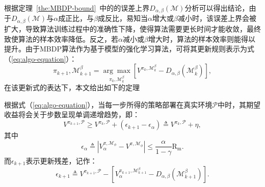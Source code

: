 根据定理~\ref{the:MBDP-bound}~中的的误差上界$D_{\alpha,\beta}(\mathcal{M})$分析可以得出结论，由于$D_{\alpha,\beta}(\mathcal{M})$与$\alpha$成正比，与$\beta$成反比，易知当$\alpha$增大或$\beta$减小时，该误差上界会被扩大，导致算法训练过程中的准确性下降，使得算法需要更长时间才能收敛，最终致使算法的样本效率降低。反之，若$\alpha$减小或$\beta$增大时，算法的样本效率则能得以提升。由于MBDP算法作为基于模型的强化学习算法，可将其更新规则表示为式（\ref{eq:algo-equation}）：
\begin{equation}
    \pi_{k+1}, \mathcal{M}^\beta_{k+1}=\underset{\pi_k, \mathcal{M}_k^\beta}{\arg\max}\left[{V}^{\pi_k, \mathcal{M}_k^\beta}-D_{\alpha,\beta}(\mathcal{M}^\beta_k)\right],
\label{eq:algo-equation}
\end{equation}
在该更新式的表达下，本文给出如下的定理
\begin{theorem}
根据式（\ref{eq:algo-equation}），当每一步所得的策略部署在真实环境$\mathcal{P}$中时，其期望收益将会关于步数呈现单调递增趋势，即：
\begin{equation}
    {V}^{\pi_{k+1}, \mathcal{P}}\geq {V}^{\pi_{k}, \mathcal{P}} + (\epsilon_{k+1} - \epsilon_\alpha) \triangleq {V}^{\pi_{k}, \mathcal{P}} + \eta,
\end{equation}
其中
\begin{equation}
    \epsilon_\alpha \triangleq |{V}_\alpha^{\pi, \mathcal{M}_{\phi}} - {V}^{\pi,\mathcal{M}_{\phi}}|   \leq \frac{\alpha}{1-\gamma}\mathrm{R_{m}}.
\end{equation}
而$\epsilon_{k+1}$表示更新残差，记作：
\begin{equation}
    \epsilon_{k+1} \triangleq {V}^{\pi_{k+1}, \mathcal{P}} - \left[{V}_{\alpha}^{\pi_{k+1}, \mathcal{M}_{k+1}^\beta} - D_{\alpha,\beta}(\mathcal{M}_{k+1}^\beta)\right].
\end{equation}
\label{prop:performance}
\end{theorem}

